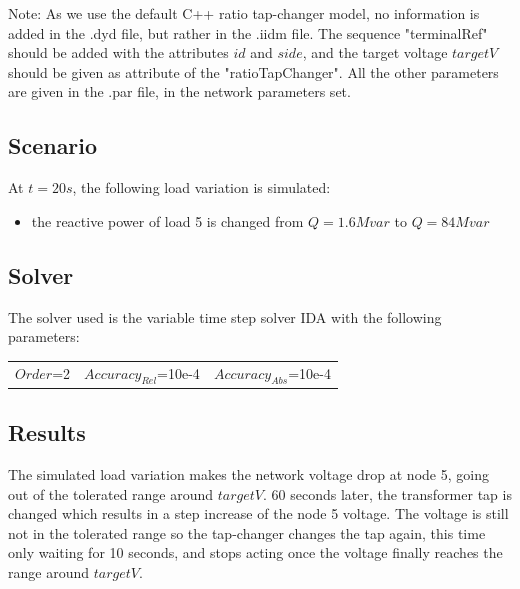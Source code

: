 \documentclass[a4paper, 12pt]{report}
\begin{document}
Note: As we use the default C++ ratio tap-changer model, no information is added in the .dyd file, but rather in the .iidm file. The sequence "terminalRef" should be added with the attributes $id$ and $side$, and the target voltage $targetV$ should be given as attribute of the "ratioTapChanger". All the other parameters are given in the .par file, in the network parameters set.

\subsection{Scenario}
At $t=20s$, the following load variation is simulated:
\begin{itemize}
\item{the reactive power of load 5 is changed from $Q=1.6Mvar$ to $Q=84Mvar$}
\end{itemize}

\subsection{Solver}
The solver used is the variable time step solver IDA with the following parameters:
\begin{center}
\begin{tabular}{l|l|l}
   $Order$=2 & $Accuracy_{Rel}$=10e-4 & $Accuracy_{Abs}$=10e-4 \\
\end{tabular}
\end{center}

\subsection{Results}

The simulated load variation makes the network voltage drop at node 5, going out of the tolerated range around $targetV$. 60 seconds later, the transformer tap is changed which results in a step increase of the node 5 voltage. The voltage is still not in the tolerated range so the tap-changer changes the tap again, this time only waiting for 10 seconds, and stops acting once the voltage finally reaches the range around $targetV$.
\end{document}
